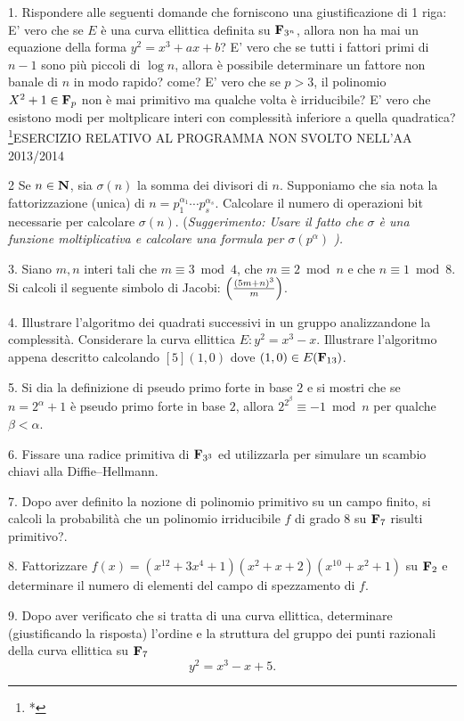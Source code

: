 \item{1.} Rispondere alle seguenti domande che forniscono una giustificazione di 1 riga:
 E' vero che se $E$ \`e una curva ellittica definita su ${\bf F}_{3^n}$, allora
non ha mai un equazione della forma $y^2=x^3+ax+b$?
 E' vero che se tutti i fattori primi di $n-1$ sono pi\`u piccoli di $\log n$, allora \`e
possibile determinare un fattore non banale di $n$ in modo rapido? come?
 E' vero che se $p>3$, il polinomio $X^2+1\in{\bf F}_p$ non \`e mai primitivo ma qualche volta \`e
irriducibile?
 E' vero che esistono modi per moltplicare interi con complessit\`a 
inferiore a quella quadratica? \footnote{*}{ESERCIZIO RELATIVO AL PROGRAMMA NON SVOLTO NELL'AA 2013/2014} 
\item{2} Se $n\in{\bf N}$, sia $\sigma(n)$ la somma dei divisori di $n$. Supponiamo che sia nota
la fattorizzazione (unica) di $n=p_1^{\alpha_1}\cdots p_s^{\alpha_s}$. Calcolare il
numero di operazioni bit necessarie per calcolare $\sigma(n)$.  
(\it Suggerimento: Usare il
fatto che $\sigma$ \`{e} una funzione moltiplicativa e calcolare una formula per $\sigma(p^\alpha)$ \rm).
\item{3.} Siano $m,n$ interi tali che $m\equiv3\bmod4$,
che $m\equiv2\bmod n$ e che $n\equiv1\bmod8$. Si calcoli il
seguente simbolo di Jacobi: $\left({(5m+n)^3 \over m}\right)$.
\item{4.}  Illustrare l'algoritmo dei quadrati successivi in un gruppo analizzandone la complessit\`{a}. Considerare
la curva ellittica $E: y^2=x^3-x.$ Illustrare l'algoritmo appena descritto calcolando $[5](1,0)$ dove $(1,0)\in E({\bf F}_{13})$.
\item{5.}  Si dia la definizione di pseudo primo forte in base $2$ e si mostri che
se $n=2^\alpha+1$ \`{e} pseudo primo forte in base $2$, allora
$2^{2^\beta}\equiv -1\bmod n$ per qualche $\beta<\alpha$.
\item{6.} Fissare una radice primitiva di ${\bf F}_{3^3}$ ed
 utilizzarla per simulare un scambio chiavi alla Diffie--Hellmann.
\item{7.} Dopo aver definito la nozione di polinomio primitivo su un campo finito, si calcoli la probabilit\`{a} che un polinomio
irriducibile $f$ di grado $8$ su ${\bf F}_{7}$ risulti primitivo?.
\item{8.}  Fattorizzare
$f(x)=(x^{12}+3x^{4}+1)(x^2+x+2)(x^{10}+x^2+1)$ su ${\bf
  F}_2$ e determinare il numero di elementi del campo di spezzamento di $f$.
\item{9.}  Dopo aver verificato che si tratta di una curva ellittica, determinare (giustificando la risposta)
l'ordine e la struttura del gruppo dei punti razionali della curva ellittica su
${\bf F}_7$
$$y^2=x^3-x+5.$$
\bye